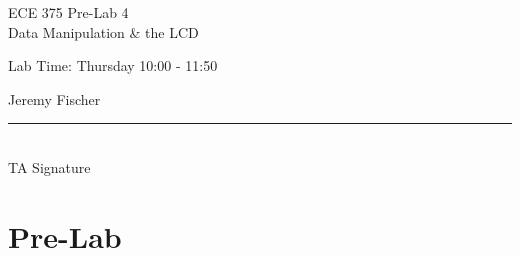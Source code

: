 \documentclass[12pt,letterpaper]{article}
\begin{document}
\begin{titlepage}
    \vspace*{4cm}
    \begin{flushright}
    {\huge
        ECE 375 Pre-Lab 4\\[1cm]
    }
    {\large
     	Data Manipulation \& the LCD
    }
    \end{flushright}
    \begin{flushleft}
    Lab Time: Thursday 10:00 - 11:50
    \end{flushleft}
    \begin{flushright}
    Jeremy Fischer
    
    \vfill
    \rule{5in}{.5mm}\\
    TA Signature
    \end{flushright}

\end{titlepage}


\section{Pre-Lab}
\end{document}
